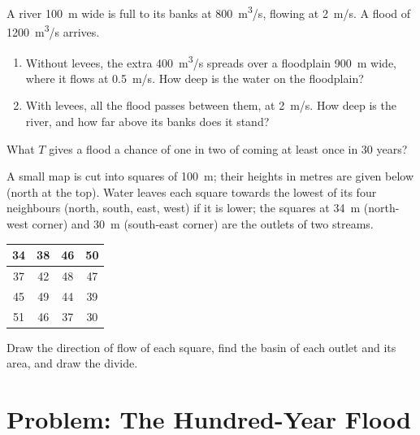 \begin{exercise}[$\star\star\star$]\label{exo:g10:drainage-basins:13}
A river \qty{100}{m} wide is full to its banks at \qty{800}{m^3/s}, flowing
at \qty{2}{m/s}. A flood of \qty{1200}{m^3/s} arrives.
\begin{enumerate}
  \item Without levees, the extra \qty{400}{m^3/s} spreads over a floodplain
        \qty{900}{m} wide, where it flows at \qty{0.5}{m/s}. How deep is the
        water on the floodplain?
  \item With levees, all the flood passes between them, at \qty{2}{m/s}.
        How deep is the river, and how far above its banks does it stand?
\end{enumerate}
\end{exercise}

\begin{exercise}[$\star\star\star$]\label{exo:g10:drainage-basins:14}
What  $T$ gives a flood a chance of one in two of coming at
least once in \num{30} years?
\end{exercise}

\begin{exercise}[$\star\star\star$]\label{exo:g10:drainage-basins:15}
A small map is cut into squares of \qty{100}{m}; their heights in metres are
given below (north at the top). Water leaves each square towards the lowest
of its four neighbours (north, south, east, west) if it is lower; the squares
at \qty{34}{m} (north-west corner) and \qty{30}{m} (south-east corner) are the
outlets of two streams.
\begin{center}
\begin{tabular}{|c|c|c|c|}
\hline
34 & 38 & 46 & 50 \\ \hline
37 & 42 & 48 & 47 \\ \hline
45 & 49 & 44 & 39 \\ \hline
51 & 46 & 37 & 30 \\ \hline
\end{tabular}
\end{center}
Draw the direction of flow of each square, find the basin of each outlet and
its area, and draw the divide.
\end{exercise}

\section{Problem: The Hundred-Year Flood}

